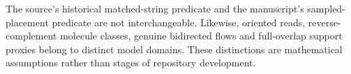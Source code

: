 The source's historical matched-string predicate and the manuscript's
sampled-placement predicate are not interchangeable. Likewise, oriented
reads, reverse-complement molecule classes, genuine bidirected flows and
full-overlap support proxies belong to distinct model domains.
These distinctions are mathematical assumptions rather than stages of
repository development.
